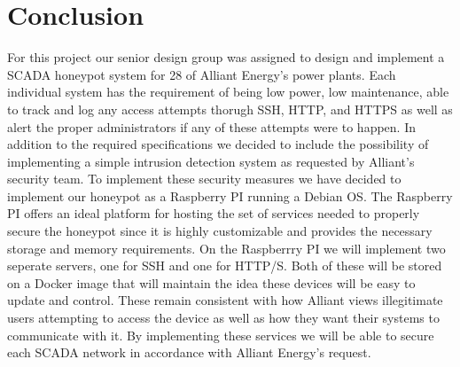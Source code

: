 \chapter{Conclusion}

For this project our senior design group was assigned to design and implement a SCADA honeypot system for 28 of Alliant Energy's power plants.  Each individual system has the requirement of being low power, low maintenance, able to track and log any access attempts thorugh SSH, HTTP, and HTTPS as well as alert the proper administrators if any of these attempts were to happen.  In addition to the required specifications we decided to include the possibility of implementing a simple intrusion detection system as requested by Alliant's security team.  To implement these security measures we have decided to implement our honeypot as a Raspberry PI running a Debian OS.  The Raspberry PI offers an ideal platform for hosting the set of services needed to properly secure the honeypot since it is highly customizable and provides the necessary storage and memory requirements.  On the Raspberrry PI we will implement two seperate servers, one  for SSH and one for HTTP/S.  Both of these will be stored on a Docker image that will maintain the idea these devices will be easy to update and control.  These remain consistent with how Alliant views illegitimate users attempting to access the device as well as how they want their systems to communicate with it.  By implementing these services we will be able to secure each SCADA network in accordance with Alliant Energy's request.
